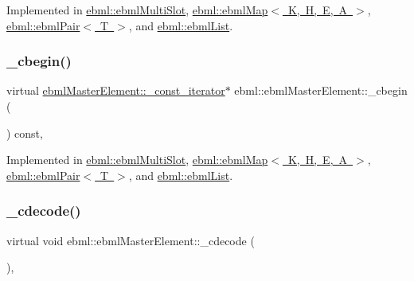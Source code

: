 Implemented in \mbox{\hyperlink{classebml_1_1ebmlMultiSlot_a61a2bb09ccbf771a9023774e0cdcbad2}{ebml\+::ebml\+Multi\+Slot}}, \mbox{\hyperlink{classebml_1_1ebmlMap_a1e395f6d3d365562e5bebc37b3cba8ef}{ebml\+::ebml\+Map$<$ K, H, E, A $>$}}, \mbox{\hyperlink{classebml_1_1ebmlPair_a1bd75b88b0b88d39a48283a2d8e9be4e}{ebml\+::ebml\+Pair$<$ T $>$}}, and \mbox{\hyperlink{classebml_1_1ebmlList_a95b8de53fe3688ba73ee488e8ca94566}{ebml\+::ebml\+List}}.

\mbox{\label{classebml_1_1ebmlMasterElement_a7e1ffa498e22b637a6671df14aa0bc45}} 
\subsubsection{\texorpdfstring{\+\_\+cbegin()}{\_cbegin()}}
{\footnotesize\ttfamily virtual \mbox{\hyperlink{classebml_1_1ebmlMasterElement_1_1__const__iterator}{ebml\+Master\+Element\+::\+\_\+const\+\_\+iterator}}$\ast$ ebml\+::ebml\+Master\+Element\+::\+\_\+cbegin (\begin{DoxyParamCaption}{ }\end{DoxyParamCaption}) const\hspace{0.3cm}{\ttfamily [protected]}, {}}



Implemented in \mbox{\hyperlink{classebml_1_1ebmlMultiSlot_adf1816c367909a1d265f38419febf9c7}{ebml\+::ebml\+Multi\+Slot}}, \mbox{\hyperlink{classebml_1_1ebmlMap_aa2f09d5ea0bf736dc32a4f04732fd4ba}{ebml\+::ebml\+Map$<$ K, H, E, A $>$}}, \mbox{\hyperlink{classebml_1_1ebmlPair_aa52de57679fd688de58ffebb225db68e}{ebml\+::ebml\+Pair$<$ T $>$}}, and \mbox{\hyperlink{classebml_1_1ebmlList_a7f215c99205ac37681fe7314463171bc}{ebml\+::ebml\+List}}.

\mbox{\label{classebml_1_1ebmlMasterElement_a71a69b9b1f5fe071ec5c91867ea520a0}} 
\subsubsection{\texorpdfstring{\+\_\+cdecode()}{\_cdecode()}\hspace{0.1cm}{\footnotesize\ttfamily [1/2]}}
{\footnotesize\ttfamily virtual void ebml\+::ebml\+Master\+Element\+::\+\_\+cdecode (\begin{DoxyParamCaption}\item[{const \mbox{\hyperlink{classebml_1_1parseString}{parse\+String}} \&}]{ }\end{DoxyParamCaption})\hspace{0.3cm}{\ttfamily [protected]}, {\ttfamily [virtual]}}



